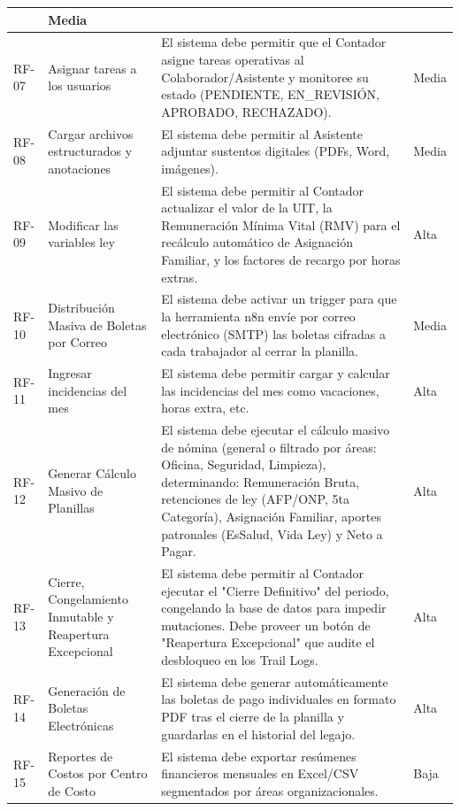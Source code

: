 \begin{longtable}{|l|p{4cm}|p{6cm}|l|}
    & Media \\ \hline
    RF-07 & 
    Asignar tareas a los usuarios & 
    El sistema debe permitir que el Contador asigne tareas operativas al Colaborador/Asistente y monitoree su estado (PENDIENTE, EN_REVISIÓN, APROBADO, RECHAZADO).
    & Media \\ \hline
    RF-08 & 
    Cargar archivos estructurados y anotaciones & 
    El sistema debe permitir al Asistente adjuntar sustentos digitales (PDFs, Word, imágenes). & 
    Media \\ \hline
    RF-09 & 
    Modificar las variables ley & 
    El sistema debe permitir al Contador actualizar el valor de la UIT, la Remuneración Mínima Vital (RMV) para el recálculo automático de Asignación Familiar, y los factores de recargo por horas extras.
    & Alta \\ \hline
    RF-10 & 
    Distribución Masiva de Boletas por Correo & 
    El sistema debe activar un trigger para que la herramienta n8n envíe por correo electrónico (SMTP) las boletas cifradas a cada trabajador al cerrar la planilla.
    & Media \\ \hline
    RF-11 & 
    Ingresar incidencias del mes & 
    El sistema debe permitir cargar y calcular las incidencias del mes como vacaciones, horas extra, etc. 
    & Alta \\ \hline
    RF-12 & 
    Generar Cálculo Masivo de Planillas & 
    El sistema debe ejecutar el cálculo masivo de nómina (general o filtrado por áreas: Oficina, Seguridad, Limpieza), determinando: Remuneración Bruta, retenciones de ley (AFP/ONP, 5ta Categoría), Asignación Familiar, aportes patronales (EsSalud, Vida Ley) y Neto a Pagar.
    & Alta \\ \hline
    RF-13 & 
    Cierre, Congelamiento Inmutable y Reapertura Excepcional & 
    El sistema debe permitir al Contador ejecutar el "Cierre Definitivo" del periodo, congelando la base de datos para impedir mutaciones. Debe proveer un botón de "Reapertura Excepcional" que audite el desbloqueo en los Trail Logs.
    & Alta \\ \hline
    RF-14 & 
    Generación de Boletas Electrónicas & 
    El sistema debe generar automáticamente las boletas de pago individuales en formato PDF tras el cierre de la planilla y guardarlas en el historial del legajo.
    & Alta \\ \hline
    RF-15 & 
    Reportes de Costos por Centro de Costo & 
    El sistema debe exportar resúmenes financieros mensuales en Excel/CSV segmentados por áreas organizacionales.
    & Baja \\ \hline
\end{longtable}